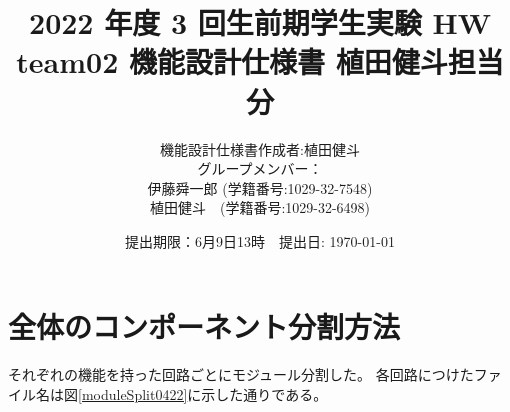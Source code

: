 \documentclass[a4j,titlepage]{jarticle}
\begin{document}
\title{2022 年度 3 回生前期学生実験 HW  \\ \bf team02 機能設計仕様書 植田健斗担当分}
\author{機能設計仕様書作成者:植田健斗\\
グループメンバー：\\伊藤舜一郎 (学籍番号:1029-32-7548)
\\植田健斗　(学籍番号:1029-32-6498)}
\date{提出期限：6月9日13時　提出日: \today} %
\maketitle
\newpage


\section{全体のコンポーネント分割方法}

それぞれの機能を持った回路ごとにモジュール分割した。
各回路につけたファイル名は図\ref{moduleSplit0422}に示した通りである。
\end{document}
